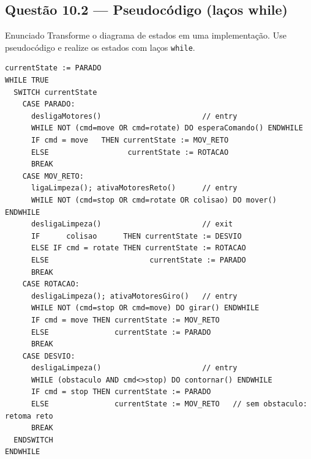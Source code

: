 \documentclass[11pt,a4paper]{article}
\begin{document}
\subsection*{Questão 10.2 — Pseudocódigo (laços while)}
\begin{questao}{Enunciado}
Transforme o diagrama de estados em uma implementação. Use pseudocódigo e
realize os estados com laços \texttt{while}.
\end{questao}
\begin{resposta}
\begin{lstlisting}
currentState := PARADO
WHILE TRUE
  SWITCH currentState
    CASE PARADO:
      desligaMotores()                       // entry
      WHILE NOT (cmd=move OR cmd=rotate) DO esperaComando() ENDWHILE
      IF cmd = move   THEN currentState := MOV_RETO
      ELSE                  currentState := ROTACAO
      BREAK
    CASE MOV_RETO:
      ligaLimpeza(); ativaMotoresReto()      // entry
      WHILE NOT (cmd=stop OR cmd=rotate OR colisao) DO mover() ENDWHILE
      desligaLimpeza()                       // exit
      IF      colisao      THEN currentState := DESVIO
      ELSE IF cmd = rotate THEN currentState := ROTACAO
      ELSE                       currentState := PARADO
      BREAK
    CASE ROTACAO:
      desligaLimpeza(); ativaMotoresGiro()   // entry
      WHILE NOT (cmd=stop OR cmd=move) DO girar() ENDWHILE
      IF cmd = move THEN currentState := MOV_RETO
      ELSE               currentState := PARADO
      BREAK
    CASE DESVIO:
      desligaLimpeza()                       // entry
      WHILE (obstaculo AND cmd<>stop) DO contornar() ENDWHILE
      IF cmd = stop THEN currentState := PARADO
      ELSE               currentState := MOV_RETO   // sem obstaculo: retoma reto
      BREAK
  ENDSWITCH
ENDWHILE
\end{lstlisting}
\end{resposta}

\end{document}

